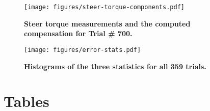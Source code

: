 \documentclass[10pt]{article}
\begin{document}
\begin{figure}[!ht]
  \centering
  \texttt{[image: figures/steer-torque-components.pdf]}
  \caption{{\bf Steer torque measurements and the computed compensation for Trial \#
    700.}}
  \label{fig:steer-torque-components}
\end{figure}

\begin{figure}[!ht]
  \centering
  \texttt{[image: figures/error-stats.pdf]}
  \caption{{\bf Histograms of the three statistics for all 359 trials.}}
  \label{fig:error-stats}
\end{figure}

\section*{Tables}
\end{document}
